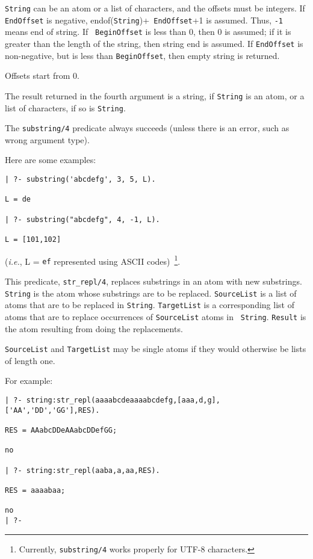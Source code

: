 \begin{description}

{\tt String} can be an atom or a list of characters, and the offsets must
be integers.  If {\tt EndOffset} is negative, endof({\tt String})+{\tt
  EndOffset}+1 is assumed. Thus, {\tt -1} means end of string.  If {\tt
  BeginOffset} is less than 0, then 0 is assumed; if it is greater than the
length of the string, then string end is assumed. If {\tt EndOffset} is
non-negative, but is less than {\tt BeginOffset}, then empty string is
returned.

Offsets start from 0.

The result returned in the fourth argument is a string, if {\tt String} is
an atom, or a list of characters, if so is {\tt String}.

The \verb|substring/4| predicate always succeeds (unless there is an error,
such as wrong argument type).

Here are some examples: 
\begin{verbatim}
| ?- substring('abcdefg', 3, 5, L).

L = de

| ?- substring("abcdefg", 4, -1, L).

L = [101,102]
\end{verbatim}
({\it i.e.}, L = {\tt ef} represented using ASCII
codes)~\footnote{Currently, {\tt substring/4} works properly for UTF-8
  characters.}.


This predicate, {\tt str\_repl/4}, replaces substrings in an atom with
new substrings.  {\tt String} is the atom whose substrings are to be
replaced.  {\tt SourceList} is a list of atoms that are to be replaced
in {\tt String}.  {\tt TargetList} is a corresponding list of atoms
that are to replace occurrences of {\tt SourceList} atoms in {\tt
  String}.  {\tt Result} is the atom resulting from doing the
replacements.

{\tt SourceList} and {\tt TargetList} may be single atoms if they
would otherwise be lists of length one.

For example:
\begin{verbatim}
| ?- string:str_repl(aaaabcdeaaaabcdefg,[aaa,d,g],['AA','DD','GG'],RES).

RES = AAabcDDeAAabcDDefGG;

no

| ?- string:str_repl(aaba,a,aa,RES).

RES = aaaabaa;

no
| ?- 
\end{verbatim}

\end{description}

